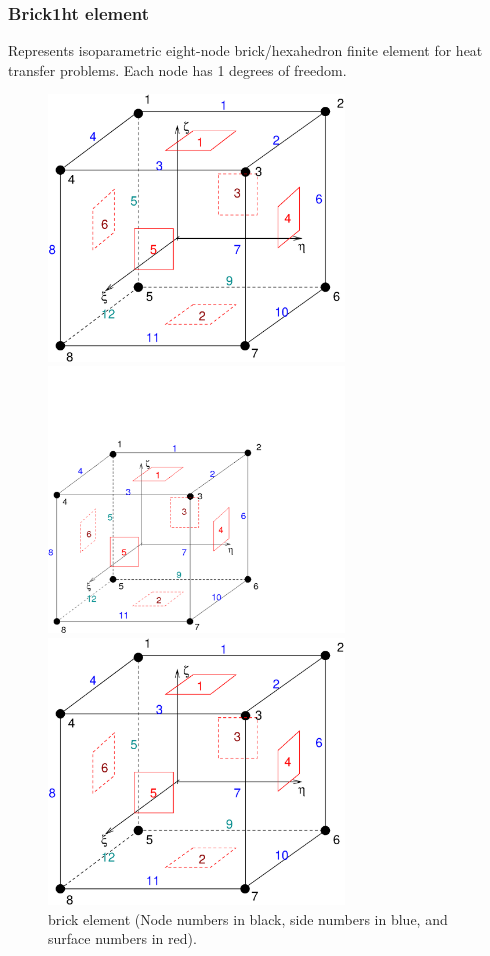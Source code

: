 \documentclass[a4paper]{article}
\begin{document}
\subsubsection{Brick1ht element}
\label{Brick1ht}
Represents isoparametric eight-node brick/hexahedron finite element for
heat transfer problems. Each node has 1 degrees of freedom.
\begin{figure}[tb]
\begin{htmlonly}
  \centerline{\includegraphics[width=0.7\textwidth]{hexa_lin.eps}}
\end{htmlonly}
\ifpdf
 \centerline{\includegraphics[width=0.7\textwidth]{hexa_lin.pdf}}
\else
 \centerline{\includegraphics[width=0.7\textwidth]{hexa_lin.eps}}
\fi
\caption{brick element (Node numbers in black, side numbers in blue,
and surface numbers in red).}
\label{Brick1htfig}
\end{figure}
\end{document}
